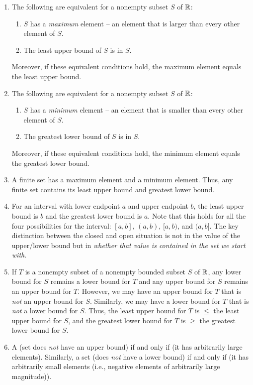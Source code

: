 \documentclass{amsart}
\begin{document}
\begin{enumerate}
\item The following are equivalent for a nonempty subset $S$ of $\mathbb{R}$:
  \begin{enumerate}
  \item $S$ has a {\em maximum} element -- an element that is larger
    than every other element of $S$.
  \item The least upper bound of $S$ is in $S$.
  \end{enumerate}
  Moreover, if these equivalent conditions hold, the maximum element
  equals the least upper bound.
\item The following are equivalent for a nonempty subset $S$ of $\mathbb{R}$:
  \begin{enumerate}
  \item $S$ has a {\em minimum} element -- an element that is smaller
    than every other element of $S$.
  \item The greatest lower bound of $S$ is in $S$.
  \end{enumerate}
  Moreover, if these equivalent conditions hold, the minimum element
  equals the greatest lower bound.
\item A finite set has a maximum element and a minimum element. Thus,
  any finite set contains its least upper bound and greatest lower
  bound.
\item For an interval with lower endpoint $a$ and upper endpoint $b$,
  the least upper bound is $b$ and the greatest lower bound is
  $a$. Note that this holds for all the four possibilities for the
  interval: $[a,b]$, $(a,b)$, $[a,b)$, and $(a,b]$. The key
  distinction between the closed and open situation is not in the
  value of the upper/lower bound but in {\em whether that value is
  contained in the set we start with}.
\item If $T$ is a nonempty subset of a nonempty bounded subset $S$ of
  $\mathbb{R}$, any lower bound for $S$ remains a lower bound for $T$ and any
  upper bound for $S$ remains an upper bound for $T$. However, we may
  have an upper bound for $T$ that is {\em not} an upper bound for
  $S$. Similarly, we may have a lower bound for $T$ that is {\em not}
  a lower bound for $S$. Thus, the least upper bound for $T$ is $\le$
  the least upper bound for $S$, and the greatest lower bound for $T$
  is $\ge$ the greatest lower bound for $S$.
\item A (set does {\em not} have an upper bound) if and only if (it has
  arbitrarily large elements). Similarly, a set (does {\em not} have a
  lower bound) if and only if (it has arbitrarily small elements (i.e.,
  negative elements of arbitrarily large magnitude)).
\end{enumerate}
\end{document}
